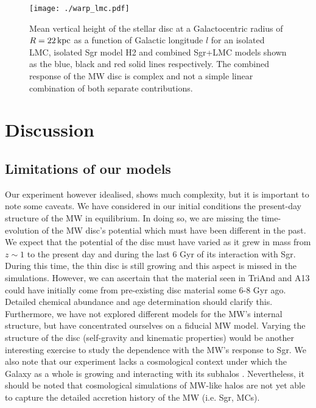 \documentclass[useAMS,usenatbib]{mnras}
\begin{document}
{\begin{figure}
\texttt{[image: ./warp\_lmc.pdf]}
\caption[]{Mean vertical height of the stellar disc at a Galactocentric radius of $R=22\,\rm{kpc}$ as a function of Galactic longitude $l$ for an isolated LMC, isolated Sgr model H2 and combined Sgr+LMC models shown as the blue, black and red solid lines respectively. The combined response of the MW disc is complex and not a simple linear combination of both separate contributions.}
\end{figure}



\section{Discussion}

\subsection{Limitations of our models}
Our experiment however idealised, shows much complexity, but it is important to note some caveats. We have considered in our initial conditions the present-day structure of the MW in equilibrium. In doing so, we are missing the time-evolution of the MW disc's potential which must have been different in the past. We expect that the potential of the disc must have varied as it grew in mass from $z\sim1$ to the present day and during the last 6 Gyr of its interaction with Sgr. During this time, the thin disc is still growing and this aspect is missed in the simulations. However, we can ascertain that the material seen in TriAnd and A13 could have initially come from pre-existing disc material some 6-8 Gyr ago. Detailed chemical abundance and age determination should clarify this. Furthermore, we have not explored different models for the MW's internal structure, but have concentrated ourselves on a fiducial MW model. Varying the structure of the disc (self-gravity and kinematic properties) would be another interesting exercise to study the dependence with the MW's response to Sgr. We also note that our experiment lacks a cosmological context under which the Galaxy as a whole is growing and interacting with its subhalos \citep{aumer13,grand17,ma17}. Nevertheless, it should be noted that cosmological simulations of MW-like halos are not yet able to capture the detailed accretion history of the MW (i.e. Sgr, MCs).

}
\end{document}
